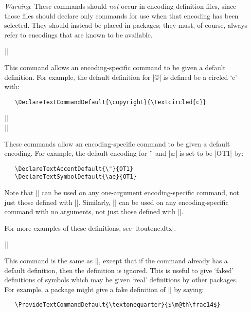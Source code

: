\documentclass{ltxguide}[1995/11/28]
\begin{document}
\emph{Warning}: These commands should \emph{not} occur in encoding
definition files, since those files should declare only commands for use
when that encoding has been selected.  They should instead be placed in
packages; they must, of course, always refer to encodings that are known
to be available.

\begin{decl}[1994/12/01]
  |\DeclareTextCommandDefault|  
\end{decl}
This command allows an encoding-specific command to be given a default
definition.  For example, the default definition for |\copyright| is
defined be a circled `c' with:
\begin{verbatim}
   \DeclareTextCommandDefault{\copyright}{\textcircled{c}}
\end{verbatim}
\begin{decl}[1994/12/01]
  |\DeclareTextAccentDefault|   \\
  |\DeclareTextSymbolDefault|  
\end{decl}
These commands allow an encoding-specific command to be given a default
encoding.  For example, the default encoding for |\"| and |\ae| is set
to be |OT1| by:
\begin{verbatim}
   \DeclareTextAccentDefault{\"}{OT1}
   \DeclareTextSymbolDefault{\ae}{OT1}
\end{verbatim}
Note that |\DeclareTextAccentDefault| can be used on any one-argument
encoding-specific command, not just those defined with
|\DeclareTextAccent|.  Similarly, |\DeclareTextSymbolDefault| can be
used on any encoding-specific command with no arguments, not just those
defined with |\DeclareTextSymbol|.

For more examples of these definitions, see |ltoutenc.dtx|.

\begin{decl}[1994/12/01]
  |\ProvideTextCommandDefault|  
\end{decl}
This command is the same as |\DeclareTextCommandDefault|, except that if
the command already has a default definition, then the definition is
ignored.  This is useful to give `faked' definitions of symbols which
may be given `real' definitions by other packages.  For example, a
package might give a fake definition of |\textonequarter| by saying:
\begin{verbatim}
   \ProvideTextCommandDefault{\textonequarter}{$\m@th\frac14$}
\end{verbatim}
\end{document}
